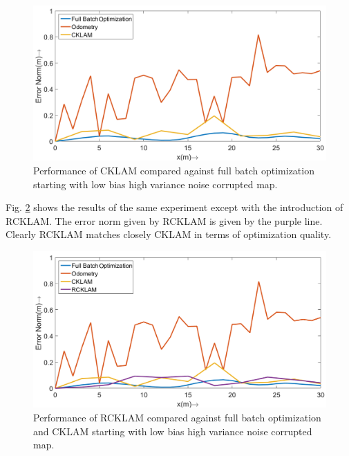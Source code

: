   
\begin{figure}
  \centering
    \includegraphics[width=1.00\textwidth]{images/Syn31_error_plot_CKLAM.png}
  \caption{Performance of CKLAM compared against full batch optimization starting with low bias high variance noise corrupted map.}
  \label{fig:Syn31ErrorPlotCKLAM}
\end{figure}
  
  
  Fig. \ref{fig:Syn31ErrorPlot} shows the results of the same experiment except with the introduction of RCKLAM. The error norm given by RCKLAM is given by the purple line. Clearly RCKLAM matches closely CKLAM in terms of optimization quality.
    
  \begin{figure}
    \centering
      \includegraphics[width=1.00\textwidth]{images/Syn31_error_plot.png}
    \caption{Performance of RCKLAM compared against full batch optimization and CKLAM starting with low bias high variance noise corrupted map.}
    \label{fig:Syn31ErrorPlot}
  \end{figure}
  
